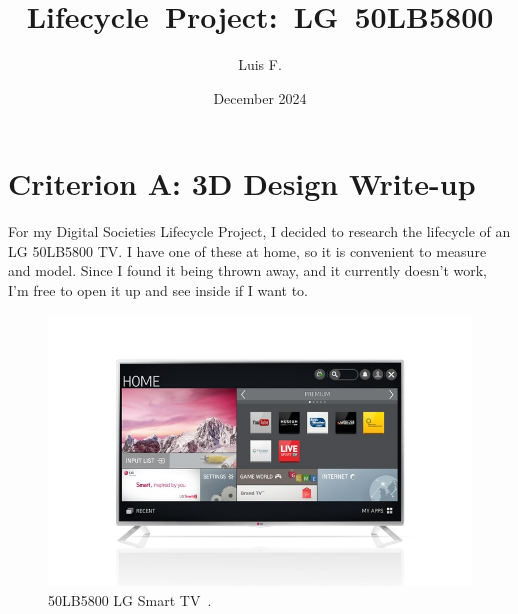 \documentclass[12pt, letterpaper]{article}
\begin{document}
\title{\vspace{-3em}\Large{\textbf{\mbox{\hspace{-0.25em}Lifecycle
Project: LG 50LB5800}}}} %
\author{\small{Luis F.}}
\date{\vspace{-0.5em}\small{December 2024}}

\maketitle

\renewenvironment{abstract}
{
  \begin{quote}
  \noindent \rule{\linewidth}{.5pt}\par{\bfseries \abstractname.}}
  {\\ \noindent \rule{\linewidth}{.5pt}\medskip
  \end{quote}
}

\vspace{-2em}

\tableofcontents

\section{Criterion A: 3D Design Write-up}

For my Digital Societies Lifecycle Project, I decided to research the
lifecycle of an LG 50LB5800 TV. I have one of these at home, so it is
convenient to measure and model. Since I found it being thrown away,
and it currently doesn't work, I'm free to open it up and see inside
if I want to.

\begin{figure}[H]
  \medskip
  \centering
  \includegraphics[width=1\linewidth]{lg-50LB5800}
  \caption{50LB5800 LG Smart TV~\autocite{unknown-author-no-dateB}.}
  \medskip
  \label{fig:lg-50LB5800}
\end{figure}
\end{document}
